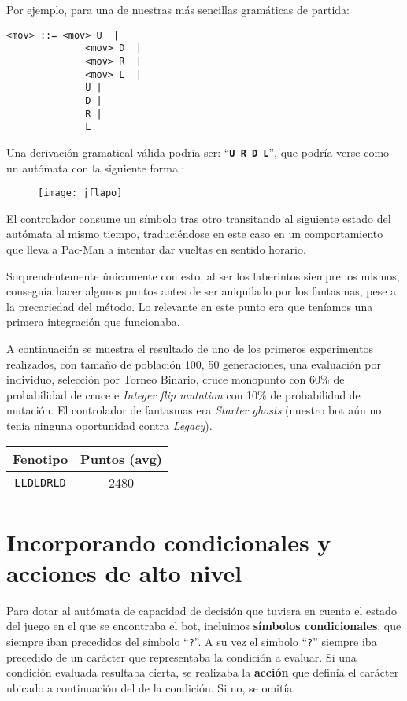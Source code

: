 Por ejemplo, para una de nuestras más sencillas gramáticas de partida:
\begin{lstlisting}[frame=single, breaklines=no, basicstyle=\fontsize{10}{11}\ttfamily]
    <mov> ::= <mov> U  | 
              <mov> D  | 
              <mov> R  | 
              <mov> L  |
              U | 
              D | 
              R |
              L
\end{lstlisting}

Una derivación gramatical válida podría ser: ``\textbf{\texttt{U R D L}}'', que podría verse como un autómata con la siguiente forma \cite{jflapPage}:
\begin{figure}[H]
\centering
\texttt{[image: jflapo]}
\end{figure}

El controlador consume un símbolo tras otro transitando al siguiente estado del autómata al mismo tiempo, traduciéndose en este caso en un comportamiento que lleva a Pac-Man a intentar dar vueltas en sentido horario.
 
Sorprendentemente únicamente con esto, al ser los laberintos siempre los mismos, conseguía hacer algunos puntos antes de ser aniquilado por los fantasmas, pese a la precariedad del método. Lo relevante en este punto era que teníamos una primera integración que funcionaba.
 
A continuación se muestra el resultado de uno de los primeros experimentos realizados, con tamaño de población 100, 50 generaciones, una evaluación por individuo, selección por Torneo Binario, cruce monopunto con 60\% de probabilidad de cruce e \textit{Integer flip mutation} con 10\% de probabilidad de mutación. El controlador de fantasmas era \textit{Starter ghosts} (nuestro bot aún no tenía ninguna oportunidad contra \textit{Legacy}).
\begin{table}[H]
\centering
\begin{tabular}{cc}
\hline
\textbf{Fenotipo} & \textbf{Puntos (avg)} \\ \hline
\texttt{LLDLDRLD}          & 2480                  \\ \hline
\end{tabular}
\end{table}

\section{Incorporando condicionales y acciones de alto nivel}
Para dotar al autómata de capacidad de decisión que tuviera en cuenta el estado del juego en el que se encontraba el bot, incluimos \textbf{símbolos condicionales}, que siempre iban precedidos del símbolo ``\texttt{?}''. A su vez el símbolo ``\texttt{?}'' siempre iba precedido de un carácter que representaba la condición a evaluar.
Si una condición evaluada resultaba cierta, se realizaba la \textbf{acción} que definía el carácter ubicado a continuación del de la condición. Si no, se omitía. 

